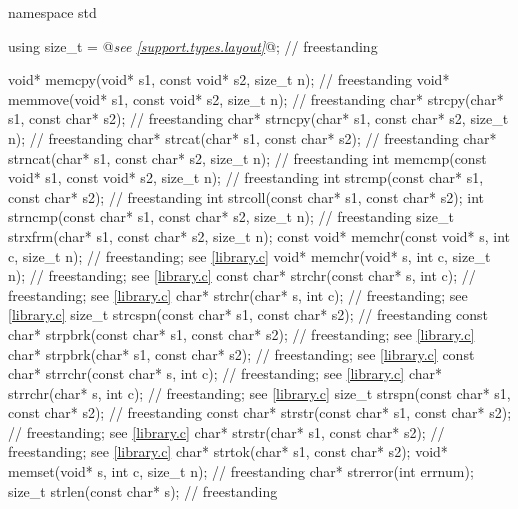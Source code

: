 %
%
%
%
%
%
%
%
%
%
%
%
%
%
%
%
%
%
%
%
%
%
%
\begin{codeblock}
namespace std {
  using size_t = @\textit{see \ref{support.types.layout}}@;                                            // freestanding

  void* memcpy(void* s1, const void* s2, size_t n);                     // freestanding
  void* memmove(void* s1, const void* s2, size_t n);                    // freestanding
  char* strcpy(char* s1, const char* s2);                               // freestanding
  char* strncpy(char* s1, const char* s2, size_t n);                    // freestanding
  char* strcat(char* s1, const char* s2);                               // freestanding
  char* strncat(char* s1, const char* s2, size_t n);                    // freestanding
  int memcmp(const void* s1, const void* s2, size_t n);                 // freestanding
  int strcmp(const char* s1, const char* s2);                           // freestanding
  int strcoll(const char* s1, const char* s2);
  int strncmp(const char* s1, const char* s2, size_t n);                // freestanding
  size_t strxfrm(char* s1, const char* s2, size_t n);
  const void* memchr(const void* s, int c, size_t n);                   // freestanding; see \ref{library.c}
  void* memchr(void* s, int c, size_t n);                               // freestanding; see \ref{library.c}
  const char* strchr(const char* s, int c);                             // freestanding; see \ref{library.c}
  char* strchr(char* s, int c);                                         // freestanding; see \ref{library.c}
  size_t strcspn(const char* s1, const char* s2);                       // freestanding
  const char* strpbrk(const char* s1, const char* s2);                  // freestanding; see \ref{library.c}
  char* strpbrk(char* s1, const char* s2);                              // freestanding; see \ref{library.c}
  const char* strrchr(const char* s, int c);                            // freestanding; see \ref{library.c}
  char* strrchr(char* s, int c);                                        // freestanding; see \ref{library.c}
  size_t strspn(const char* s1, const char* s2);                        // freestanding
  const char* strstr(const char* s1, const char* s2);                   // freestanding; see \ref{library.c}
  char* strstr(char* s1, const char* s2);                               // freestanding; see \ref{library.c}
  char* strtok(char* s1, const char* s2);
  void* memset(void* s, int c, size_t n);                               // freestanding
  char* strerror(int errnum);
  size_t strlen(const char* s);                                         // freestanding
}


\end{codeblock}
